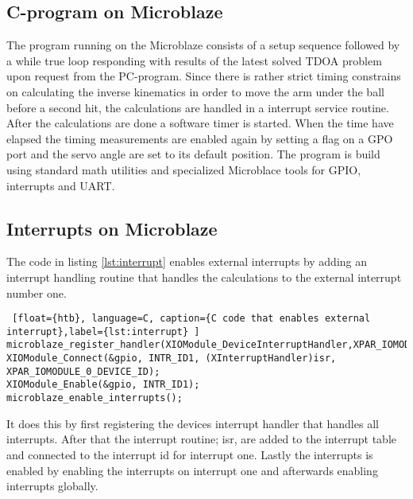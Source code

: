 \subsection{C-program on Microblaze}
The program running on the Microblaze consists of a setup sequence followed by a while true loop responding with results of the latest solved TDOA problem upon request from the PC-program. Since there is rather strict timing constrains on calculating the inverse kinematics in order to move the arm under the ball before a second hit, the calculations are handled in a interrupt service routine. 
After the calculations are done a software timer is started. When the time have elapsed the timing measurements are enabled again by setting a flag on a GPO port and the servo angle are set to its default position. The program is build using standard math utilities and specialized Microblace tools for GPIO, interrupts and UART.
%
\subsection{Interrupts on Microblaze}
The code in listing \ref{lst:interrupt} enables external interrupts by adding an interrupt handling routine that handles the calculations to the external interrupt number one.
%
\begin{lstlisting} [float={htb}, language=C, caption={C code that enables external interrupt},label={lst:interrupt} ]
microblaze_register_handler(XIOModule_DeviceInterruptHandler,XPAR_IOMODULE_0_DEVICE_ID);
XIOModule_Connect(&gpio, INTR_ID1, (XInterruptHandler)isr, XPAR_IOMODULE_0_DEVICE_ID);
XIOModule_Enable(&gpio, INTR_ID1);
microblaze_enable_interrupts();
\end{lstlisting}
It does this by first registering the devices interrupt handler that handles all interrupts. After that the interrupt routine; isr, are added to the interrupt table and connected to the interrupt id for interrupt one. Lastly the interrupts is enabled by enabling the interrupts on interrupt one and afterwards enabling interrupts globally.
%
